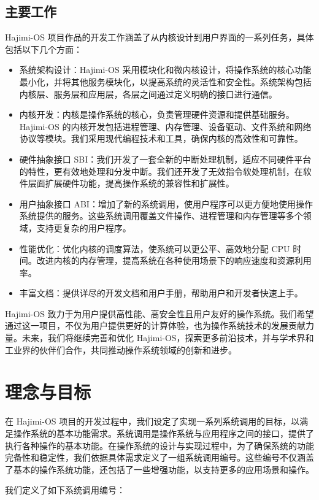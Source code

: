 \documentclass[UTF8]{article}
\begin{document}
\subsection{主要工作}
Hajimi-OS 项目作品的开发工作涵盖了从内核设计到用户界面的一系列任务，具体包括以下几个方面：

\begin{itemize}
  \item 系统架构设计：Hajimi-OS 采用模块化和微内核设计，将操作系统的核心功能最小化，并将其他服务模块化，以提高系统的灵活性和安全性。系统架构包括内核层、服务层和应用层，各层之间通过定义明确的接口进行通信。
  \item 内核开发：内核是操作系统的核心，负责管理硬件资源和提供基础服务。Hajimi-OS 的内核开发包括进程管理、内存管理、设备驱动、文件系统和网络协议等模块。我们采用现代编程技术和工具，确保内核的高效性和可靠性。
  \item 硬件抽象接口 SBI：我们开发了一套全新的中断处理机制，适应不同硬件平台的特性，更有效地处理和分发中断。我们还开发了无效指令软处理机制，在软件层面扩展硬件功能，提高操作系统的兼容性和扩展性。
  \item 用户抽象接口 ABI：增加了新的系统调用，使用户程序可以更方便地使用操作系统提供的服务。这些系统调用覆盖文件操作、进程管理和内存管理等多个领域，支持更复杂的用户程序。
  \item 性能优化：优化内核的调度算法，使系统可以更公平、高效地分配 CPU 时间。改进内核的内存管理，提高系统在各种使用场景下的响应速度和资源利用率。
  \item 丰富文档：提供详尽的开发文档和用户手册，帮助用户和开发者快速上手。
\end{itemize}

Hajimi-OS 致力于为用户提供高性能、高安全性且用户友好的操作系统。我们希望通过这一项目，不仅为用户提供更好的计算体验，也为操作系统技术的发展贡献力量。未来，我们将继续完善和优化 Hajimi-OS，探索更多前沿技术，并与学术界和工业界的伙伴们合作，共同推动操作系统领域的创新和进步。

\section{理念与目标}
在 Hajimi-OS 项目的开发过程中，我们设定了实现一系列系统调用的目标，以满足操作系统的基本功能需求。系统调用是操作系统与应用程序之间的接口，提供了执行各种操作的基本功能。在操作系统的设计与实现过程中，为了确保系统的功能完备性和稳定性，我们依据具体需求定义了一组系统调用编号。这些编号不仅涵盖了基本的操作系统功能，还包括了一些增强功能，以支持更多的应用场景和操作。

我们定义了如下系统调用编号：

\end{document}
